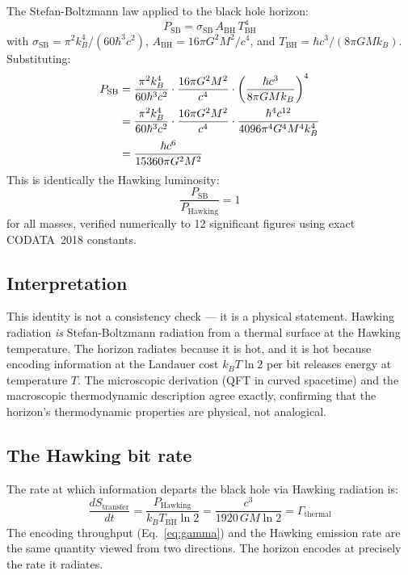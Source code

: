 \documentclass[12pt,a4paper]{article}
\begin{document}
The Stefan-Boltzmann law applied to the black hole horizon:
\begin{equation}
P_\mathrm{SB} = \sigma_\mathrm{SB}\, A_\mathrm{BH}\, T_\mathrm{BH}^4
\end{equation}
with $\sigma_\mathrm{SB} = \pi^2 k_B^4/(60\hbar^3 c^2)$,
$A_\mathrm{BH} = 16\pi G^2 M^2/c^4$, and
$T_\mathrm{BH} = \hbar c^3/(8\pi G M k_B)$. Substituting:
\begin{align}
P_\mathrm{SB}
&= \frac{\pi^2 k_B^4}{60\hbar^3 c^2}
\cdot \frac{16\pi G^2 M^2}{c^4}
\cdot \left(\frac{\hbar c^3}{8\pi G M k_B}\right)^4 \notag\\
&= \frac{\pi^2 k_B^4}{60\hbar^3 c^2}
\cdot \frac{16\pi G^2 M^2}{c^4}
\cdot \frac{\hbar^4 c^{12}}{4096\pi^4 G^4 M^4 k_B^4} \notag\\
&= \frac{\hbar c^6}{15360\pi G^2 M^2}
\end{align}
This is identically the Hawking luminosity:
\begin{equation}
\boxed{\frac{P_\mathrm{SB}}{P_\mathrm{Hawking}} = 1}
\label{eq:identity}
\end{equation}
for all masses, verified numerically to 12 significant figures using exact
CODATA~2018 constants.

\subsection{Interpretation}

This identity is not a consistency check --- it is a physical statement.
Hawking radiation \emph{is} Stefan-Boltzmann radiation from a thermal surface at
the Hawking temperature. The horizon radiates because it is hot, and it is hot
because encoding information at the Landauer cost $k_B T \ln 2$ per bit releases
energy at temperature $T$. The microscopic derivation (QFT in curved spacetime)
and the macroscopic thermodynamic description agree exactly, confirming that the
horizon's thermodynamic properties are physical, not analogical.

\subsection{The Hawking bit rate}

The rate at which information departs the black hole via Hawking radiation is:
\begin{equation}
\frac{dS_\mathrm{transfer}}{dt}
= \frac{P_\mathrm{Hawking}}{k_B T_\mathrm{BH} \ln 2}
= \frac{c^3}{1920\,G M \ln 2}
= \Gamma_\mathrm{thermal}
\end{equation}
The encoding throughput (Eq.~\ref{eq:gamma}) and the Hawking emission rate are
the same quantity viewed from two directions. The horizon encodes at precisely
the rate it radiates.
\end{document}
